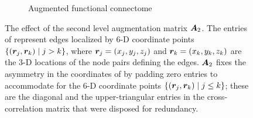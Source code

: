 \begin{figure}[t!]
\begin{subfigure}[b]{0.6\linewidth}
		\)
		\caption{Augmented functional connectome}
	\end{subfigure}
	\caption{
		The effect of the second level augmentation matrix ${\bm{A}}_2$.  
		The entries of \xstar represent edges localized by $6$-D coordinate points $\left\{({\bm{r}}_j,{\bm{r}}_k) \; |\;  j>k\right\}$, where ${\bm{r}}_j=(x_j,y_j,z_j)$ and ${\bm{r}}_k=(x_k,y_k,z_k)$ are the $3$-D locations of the node pairs defining the edges.
		${\bm{A}}_2$ fixes the asymmetry in the coordinates of \xstar by padding zero entries to accommodate for the $6$-D coordinate points $\left\{({\bm{r}}_j,{\bm{r}}_k) \; |\;  j\leq k\right\}$; these are the diagonal and the upper-triangular entries in the cross-correlation matrix that were disposed for redundancy.
	}
	\label{fig:augmat2}
\end{figure}


